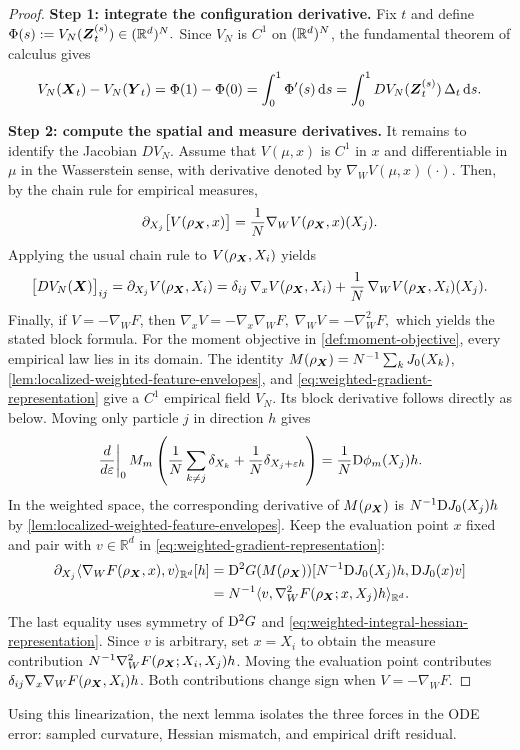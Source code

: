 \begin{proof}
\noindent\textbf{Step 1: integrate the configuration derivative.}
Fix \(t\) and define $ \Phi(s):=V_N(\boldsymbol{Z}_t^{(s)})\in(\mathbb{R}^d)^N.$
Since \(V_N\) is \(C^1\) on \((\mathbb{R}^d)^N\), the fundamental theorem of calculus gives
\[
V_N(\boldsymbol{X}_t)-V_N(\boldsymbol{Y}_t)
=
\Phi(1)-\Phi(0)
=
\int_0^1 \Phi'(s)\,\dd s
=
\int_0^1 DV_N(\boldsymbol{Z}_t^{(s)})\,\Delta_t\,\dd s.
\]
\par\noindent\textbf{Step 2: compute the spatial and measure derivatives.}
It remains to identify the Jacobian \(DV_N\).
Assume that $V(\mu,x)$ is $C^1$ in $x$ and differentiable in $\mu$ in the Wasserstein sense, with derivative denoted by $\nabla_W V(\mu,x)(\cdot)$.
Then, by the chain rule for empirical measures,
\[
\partial_{X_j}\bigl[V(\rho_{\boldsymbol{X}},x)\bigr]
=
\frac1N \nabla_W V(\rho_{\boldsymbol{X}},x)(X_j).
\]
Applying the usual chain rule to $V(\rho_{\boldsymbol{X}},X_i)$ yields
\[
\bigl[DV_N(\boldsymbol{X})\bigr]_{ij} = \partial_{X_j}V(\rho_{\boldsymbol{X}},X_i)
=
\delta_{ij}\,\nabla_x V(\rho_{\boldsymbol{X}},X_i)
+
\frac1N\,\nabla_W V(\rho_{\boldsymbol{X}},X_i)(X_j).
\]
Finally, if \(V=-\nabla_W F\), then $\nabla_x V=-\nabla_x\nabla_W F,
\;
\nabla_W V=-\nabla_W^2F,$
which yields the stated block formula.
For the moment objective in \cref{def:moment-objective}, every empirical
law lies in its domain. The identity
\(M(\rho_{\boldsymbol{X}})=N^{-1}\sum_k J_0(X_k)\),
\cref{lem:localized-weighted-feature-envelopes}, and
\eqref{eq:weighted-gradient-representation} give a \(C^1\) empirical
field \(V_N\). Its block derivative follows directly as below. Moving only
particle $j$ in direction $h$ gives
\[
 \left.\frac d{d\varepsilon}\right|_0
 M_m\left(\frac1N\sum_{k\ne j}\delta_{X_k}
              +\frac1N\delta_{X_j+\varepsilon h}\right)
 =\frac1N\mathrm{D}\phi_m(X_j)h.
\]
In the weighted space, the corresponding derivative of $M(\rho_{\boldsymbol{X}})$
is $N^{-1}\mathrm{D} J_0(X_j)h$ by
\cref{lem:localized-weighted-feature-envelopes}. Keep the evaluation point
$x$ fixed and pair with $v\in\mathbb R^d$ in
\eqref{eq:weighted-gradient-representation}:
\[
\begin{aligned}
 \partial_{X_j}\langle\nabla_WF(\rho_{\boldsymbol{X}},x),v\rangle_{\mathbb R^d}[h]
 &=\mathrm{D}^2G(M(\rho_{\boldsymbol{X}}))[N^{-1}\mathrm{D} J_0(X_j)h,\mathrm{D} J_0(x)v]\\
 &=N^{-1}\langle v,\nabla_W^2F(\rho_{\boldsymbol{X}};x,X_j)h\rangle_{\mathbb R^d}.
\end{aligned}
\]
The last equality uses symmetry of $\mathrm{D}^2G$ and
\eqref{eq:weighted-integral-hessian-representation}. Since $v$ is arbitrary, set $x=X_i$ to obtain
the measure contribution $N^{-1}\nabla_W^2F(\rho_{\boldsymbol{X}};X_i,X_j)h$.
Moving the evaluation point contributes
$\delta_{ij}\nabla_x\nabla_WF(\rho_{\boldsymbol{X}},X_i)h$.
Both contributions change sign when $V=-\nabla_WF$.
\end{proof}
Using this linearization, the next lemma isolates the three forces in the ODE error: sampled curvature, Hessian mismatch, and empirical drift residual.

